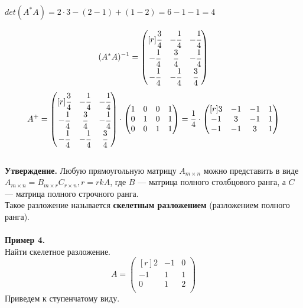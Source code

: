 \documentclass[12pt]{article}
\theoremstyle{definition}
\numberwithin{equation}{section}
\begin{document}
	\begin{center}$det (A^*A)=2\cdot 3-(2-1)+(1-2)=6-1-1=4$\end{center}
	\[(A^*A)^{-1} = \begin{pmatrix}[r]
	\cfrac{3}{4} & -\cfrac{1}{4} & -\cfrac{1}{4} \\         
	-\cfrac{1}{4} & \cfrac{3}{4} & -\cfrac{1}{4} \\
	-\cfrac{1}{4} & -\cfrac{1}{4} & \cfrac{3}{4} \\
	\end{pmatrix}\]
	\[A^+ = \begin{pmatrix}[r]
	\cfrac{3}{4} & -\cfrac{1}{4} & -\cfrac{1}{4} \\         
	-\cfrac{1}{4} & \cfrac{3}{4} & -\cfrac{1}{4} \\
	-\cfrac{1}{4} & -\cfrac{1}{4} & \cfrac{3}{4} \\
	\end{pmatrix} \cdot \begin{pmatrix}
	1 & 0 & 0 & 1 \\         
	0 & 1 & 0 & 1\\
	0 & 0 & 1 & 1\\
	\end{pmatrix} = \frac{1}{4} \cdot \begin{pmatrix}[r]
	3 & -1 & -1 & 1 \\         
	-1 & 3 & - 1 & 1 \\
	-1 & -1 & 3 & 1 \\
	\end{pmatrix}\]\\
	\textbf{Утверждение.}
	Любую прямоугольную матрицу $A_{m \times n}$ можно представить в виде 
	$A_{m \times n}=B_{m \times r}C_{r \times n}, r=rkA$, где $B$ --- матрица полного столбцового ранга, а $C$ --- матрица полного строчного ранга.\\
	Такое разложение называется \textbf{скелетным разложением} (разложением полного ранга).\\ \\
	\textbf{Пример 4.}\\
	Найти скелетное разложение.\\
	\[A = \begin{pmatrix}[r]
	2 & -1 & 0 \\         
	-1 & 1 & 1 \\
	0 & 1 & 2 \\
	\end{pmatrix}\]
	Приведем к ступенчатому виду.\\
\end{document}
